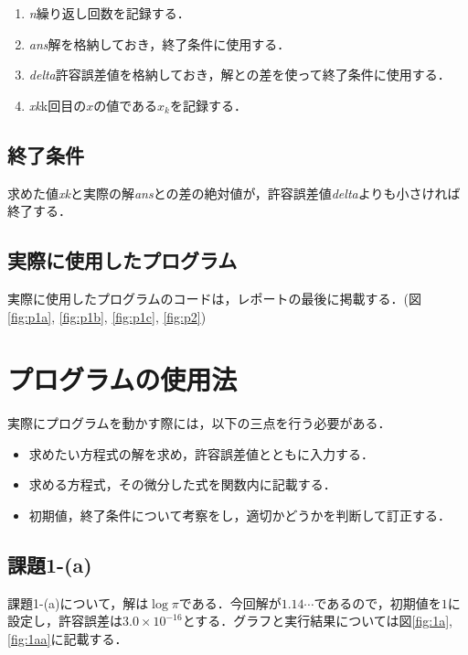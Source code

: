 \documentclass[12pt]{jarticle}
\renewcommand  \[  {\begin{eqnarray}}
\renewcommand  \]  {\end{eqnarray}}
\begin{document}
\begin{enumerate}
\item \emph{n}\qquad 繰り返し回数を記録する．
\item \emph{ans}\qquad 解を格納しておき，終了条件に使用する．
\item \emph{delta}\qquad 許容誤差値を格納しておき，解との差を使って終了条件に使用する．
\item \emph{xk}\qquad k回目の$x$の値である$x_k$を記録する．
\end{enumerate}

\subsection{終了条件}

求めた値\emph{xk}と実際の解\emph{ans}との差の絶対値が，許容誤差値\emph{delta}よりも小さければ終了する．

\subsection{実際に使用したプログラム}

実際に使用したプログラムのコードは，レポートの最後に掲載する．(図\ref{fig:p1a}, \ref{fig:p1b}, \ref{fig:p1c}, \ref{fig:p2})



\section{プログラムの使用法}

実際にプログラムを動かす際には，以下の三点を行う必要がある．
\begin{itemize}
\item 求めたい方程式の解を求め，許容誤差値とともに入力する．
\item 求める方程式，その微分した式を関数内に記載する．
\item 初期値，終了条件について考察をし，適切かどうかを判断して訂正する．
\end{itemize}

\subsection{課題1-(a)}
課題1-(a)について，解は$\log\pi$である．今回解が$1.14\cdots$であるので，初期値を$1$に設定し，許容誤差は$3.0 \times 10^{-16}$とする．グラフと実行結果については図\ref{fig:1a}, \ref{fig:1aa}に記載する．
\end{document}
